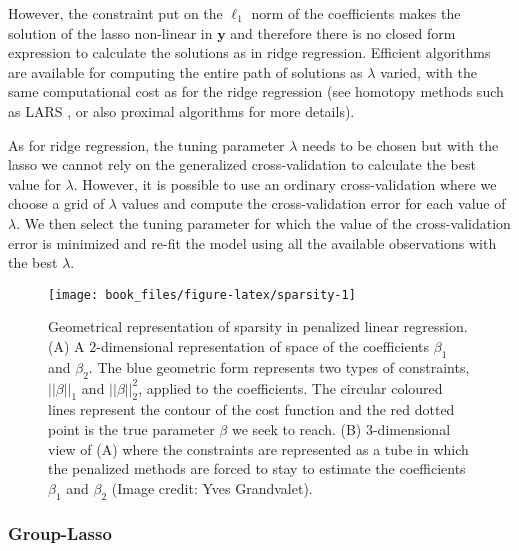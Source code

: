 \documentclass[]{book}
\begin{document}
However, the constraint put on the \(\ell_1\) norm of the coefficients
makes the solution of the lasso non-linear in \(\mathbf{y}\) and therefore there
is no closed form expression to calculate the solutions as in ridge
regression. Efficient algorithms are available for computing the entire
path of solutions as \(\lambda\) varied, with the same computational cost
as for the ridge regression (see homotopy methods \citep{osborne2000new} such
as LARS \citep{efron2004least}, or also proximal algorithms
\citep{parikh2014proximal} for more details).

As for ridge regression, the tuning parameter \(\lambda\) needs to be
chosen but with the lasso we cannot rely on the generalized
cross-validation to calculate the best value for \(\lambda\). However, it
is possible to use an ordinary cross-validation where we choose a grid
of \(\lambda\) values and compute the cross-validation error for each
value of \(\lambda\). We then select the tuning parameter for which the
value of the cross-validation error is minimized and re-fit the model
using all the available observations with the best \(\lambda\).



\begin{figure}

{\centering \texttt{[image: book\_files/figure-latex/sparsity-1]} 

}

\caption{Geometrical representation of sparsity in penalized linear regression. (A) A 2-dimensional representation of space of the coefficients \(\beta_1\) and \(\beta_2\). The blue geometric form represents two types of constraints, \(||\beta||_1\) and \(||\beta||^2_2\), applied to the coefficients. The circular coloured lines represent the contour of the cost function and the red dotted point is the true parameter \(\beta\) we seek to reach. (B) 3-dimensional view of (A) where the constraints are represented as a tube in which the penalized methods are forced to stay to estimate the coefficients \(\beta_1\) and \(\beta_2\) (Image credit: Yves Grandvalet).}\label{fig:sparsity}
\end{figure}

\hypertarget{group-lasso}{%
\subsubsection*{Group-Lasso}\label{group-lasso}}
\end{document}
